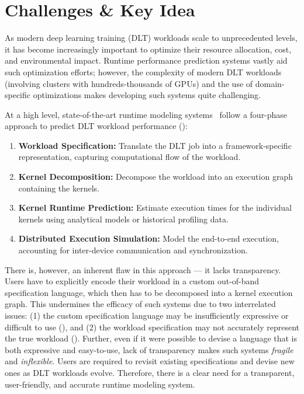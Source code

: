 \section{Challenges \& Key Idea}
\label{sec:motivation}

As modern deep learning training (DLT) workloads scale to unprecedented levels, it has become increasingly important to optimize their resource allocation, cost, and environmental impact. Runtime performance prediction systems vastly aid such optimization efforts; however, the complexity of modern DLT workloads (involving clusters with hundreds-thousands of GPUs) and the use of domain-specific optimizations makes developing such systems quite challenging.

At a high level, state-of-the-art runtime modeling systems~\cite{duan2023proteus,isaev2023calculon,bang2023vtrain,lu2023distsim,zhu2020daydream,geoffrey2021habitat,moolchandani2023amped,santhanam2021distir} follow a four-phase approach to predict DLT workload performance ():

\begin{enumerate}
\item \textbf{Workload Specification:} Translate the DLT job into a framework-specific representation, capturing computational flow of the workload.
\item \textbf{Kernel Decomposition:} Decompose the workload into an execution graph containing the kernels.
\item \textbf{Kernel Runtime Prediction:} Estimate execution times for the individual kernels using analytical models or historical profiling data.
\item \textbf{Distributed Execution Simulation:} Model the end-to-end execution, accounting for inter-device communication and synchronization.
\end{enumerate}

There is, however, an inherent flaw in this approach --- it lacks transparency. Users have to explicitly encode their workload in a custom out-of-band specification language, which then has to be decomposed into a kernel execution graph. This undermines the efficacy of such systems due to two interrelated issues: (1) the custom specification language may be insufficiently expressive or difficult to use (), and (2) the workload specification may not accurately represent the true workload (). Further, even if it were possible to devise a language that is both expressive and easy-to-use, lack of transparency makes such systems \textit{fragile} and \textit{inflexible}. Users are required to revisit existing specifications and devise new ones as DLT workloads evolve. Therefore, there is a clear need for a transparent, user-friendly, and accurate runtime modeling system.


